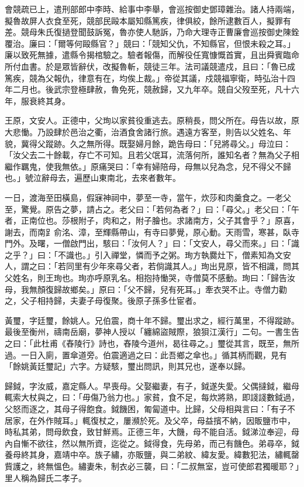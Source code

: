 \begin{pinyinscope}
會競疏已上，遣刑部郎中李時、給事中李舉，會巡按御史鄧璋雜治。諸人持兩端，擬魯故屏人衣食至死，競部民毆本屬知縣篤疾，律俱絞，餘所逮數百人，擬罪有差。競母朱氏復撾登聞鼓訴冤，魯亦使人馳訴，乃命大理寺正曹廉會巡按御史陳銓覆治。廉曰：「爾等何毆縣官？」競曰：「競知父仇，不知縣官，但恨未殺之耳。」廉以致死無據，遣縣令揭棺驗之。驗者報傷，而解役任寬慷慨首實，且出舜賓臨命所付血書。於是眾皆辭伏，改擬魯斬，競徒三年。法司議競遣戍，且曰：「魯已成篤疾，競為父報仇，律意有在，均俟上裁。」帝從其議，戍競福寧衛，時弘治十四年二月也。後武宗登極肆赦，魯免死，競赦歸，又九年卒。競自父歿至死，凡十六年，服衰終其身。

王原，文安人。正德中，父珣以家貧役重逃去。原稍長，問父所在。母告以故，原大悲慟。乃設肆於邑治之衢，治酒食舍諸行旅。遇遠方客至，則告以父姓名、年貌，冀得父蹤跡。久之無所得。既娶婦月餘，跪告母曰：「兒將尋父。」母泣曰：「汝父去二十餘載，存亡不可知。且若父氓耳，流落何所，誰知名者？無為父子相繼作羈鬼，使我無依。」原痛哭曰：「幸有婦陪母，母無以兒為念，兒不得父不歸也。」號泣辭母去，遍歷山東南北，去來者數年。

一日，渡海至田橫島，假寐神祠中，夢至一寺，當午，炊莎和肉羹食之。一老父至，驚覺。原告之夢，請占之。老父曰：「若何為者？」曰：「尋父。」老父曰：「午者，正南位也。莎根附子，肉和之，附子膾也。求諸南方，父子其會乎？」原喜，謝去，而南𧾷俞洺、漳，至輝縣帶山，有寺曰夢覺，原心動。天雨雪，寒甚，臥寺門外。及曙，一僧啟門出，駭曰：「汝何人？」曰：「文安人，尋父而來。」曰：「識之乎？」曰：「不識也。」引入禪堂，憐而予之粥。珣方執爨灶下，僧素知為文安人，謂之曰：「若同里有少年來尋父者，若倘識其人。」珣出見原，皆不相識，問其父姓名，則王珣也。珣亦呼原乳名。相抱持慟哭，寺僧莫不感動。珣曰：「歸告汝母，我無顏復歸故鄉矣。」原曰：「父不歸，兒有死耳。」牽衣哭不止。寺僧力勸之，父子相持歸，夫妻子母復聚。後原子孫多仕宦者。

黃璽，字廷璽，餘姚人。兄伯震，商十年不歸。璽出求之，經行萬里，不得蹤跡。最後至衡州，禱南岳廟，夢神人授以「纏綿盜賊際，狼狽江漢行」二句。一書生告之曰：「此杜甫《舂陵行》詩也，舂陵今道州，曷往尋之。」璽從其言，既至，無所過。一日入廁，置傘道旁。伯震適過之曰：此吾鄉之傘也。」循其柄而觀，見有「餘姚黃廷璽記」六字。方疑駭，璽出問訊，則其兄也，遂奉以歸。

歸鉞，字汝威，嘉定縣人。早喪母。父娶繼妻，有子，鉞遂失愛。父偶撻鉞，繼母輒索大杖與之，曰：「毋傷乃翁力也。」家貧，食不足，每炊將熟，即諓諓數鉞過，父怒而逐之，其母子得飽食。鉞饑困，匍匐道中。比歸，父母相與言曰：「有子不居家，在外作賊耳。」輒復杖之，屢瀕於死。及父卒，母益擯不納，因販鹽市中，時私其弟，問母飲食，致甘鮮焉。正德三年，大饑，母不能自活。鉞涕泣奉迎，母內自慚不欲往，然以無所資，迄從之。鉞得食，先母弟，而己有饑色。弟尋卒，鉞養母終其身，嘉靖中卒。族子繡，亦販鹽，與二弟紋、緯友愛。緯數犯法，繡輒罄貲護之，終無慍色。繡妻朱，制衣必三襲，曰：「二叔無室，豈可使郎君獨暖耶？」里人稱為歸氏二孝子。


\end{pinyinscope}
